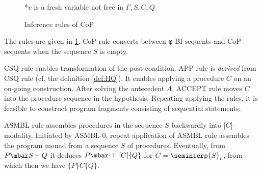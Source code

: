\begin{figure}[t]
\begin{center}
\end{center}
*$v$ is a fresh variable not free in $Γ, S, C, Q$
\normalsize
  \caption{Inference rules of CoP}\label{fig:rules}
\end{figure}


The rules are given in \cref{fig:rules}.
CoP rule converts between φ-BI sequents and CoP sequents when the sequence $S$ is empty.

CSQ rule enables transformation of the post-condition.
APP rule is \emph{derived} from CSQ rule (cf. the definition \ref{def:HQ}).
It enables applying a procedure $C$ on an on-going construction.
After solving the antecedent $A$, ACCEPT rule moves $C$ into the procedure sequence in the hypothesis.
Repeating applying the rules, it is feasible to construct program fragments consisting of sequential statements.

ASMBL rule assembles procedures in the sequence $S$ backwardly into [$C$]-modality.
Initiated by ASMBL-0, repeat application of ASMBL rule assembles the program monad from a sequence $S$ of procedures.
Eventually, from $P \mbar S \vdash Q$ it deduces $P \mbar \cdot \vdash [C]\{Q\}$ for $C = \seminterp{S}_r$, from which then we have $\{P\}C\{Q\}$.

